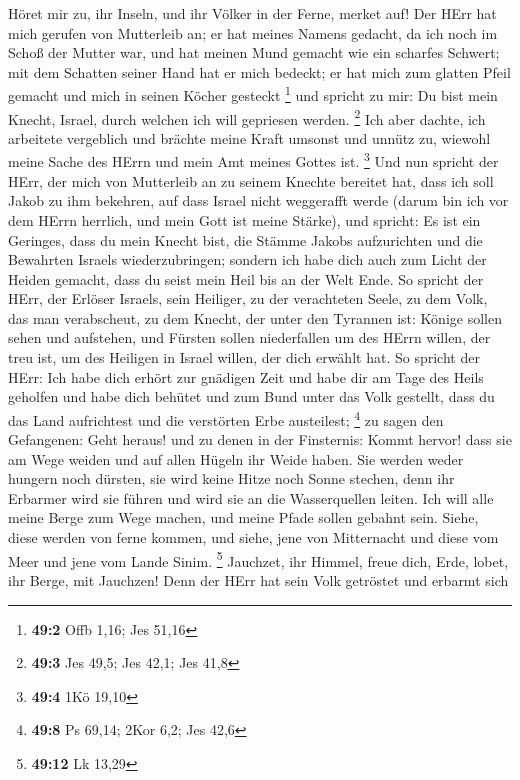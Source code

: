  Höret mir zu, ihr Inseln, und ihr Völker in der Ferne,
merket auf! Der HErr hat mich gerufen von Mutterleib an; er hat meines
Namens gedacht, da ich noch im Schoß der Mutter war,  und
hat meinen Mund gemacht wie ein scharfes Schwert; mit dem Schatten
seiner Hand hat er mich bedeckt; er hat mich zum glatten Pfeil gemacht
und mich in seinen Köcher gesteckt \footnote{\textbf{49:2} Offb 1,16;
  Jes 51,16}  und spricht zu mir: Du bist mein Knecht,
Israel, durch welchen ich will gepriesen werden. \footnote{\textbf{49:3}
  Jes 49,5; Jes 42,1; Jes 41,8}  Ich aber dachte, ich
arbeitete vergeblich und brächte meine Kraft umsonst und unnütz zu,
wiewohl meine Sache des HErrn und mein Amt meines Gottes ist.
\footnote{\textbf{49:4} 1Kö 19,10}  Und nun spricht der
HErr, der mich von Mutterleib an zu seinem Knechte bereitet hat, dass
ich soll Jakob zu ihm bekehren, auf dass Israel nicht weggerafft werde
(darum bin ich vor dem HErrn herrlich, und mein Gott ist meine Stärke),
 und spricht: Es ist ein Geringes, dass du mein Knecht bist,
die Stämme Jakobs aufzurichten und die Bewahrten Israels
wiederzubringen; sondern ich habe dich auch zum Licht der Heiden
gemacht, dass du seist mein Heil bis an der Welt Ende.  So
spricht der HErr, der Erlöser Israels, sein Heiliger, zu der verachteten
Seele, zu dem Volk, das man verabscheut, zu dem Knecht, der unter den
Tyrannen ist: Könige sollen sehen und aufstehen, und Fürsten sollen
niederfallen um des HErrn willen, der treu ist, um des Heiligen in
Israel willen, der dich erwählt hat.  So spricht der HErr:
Ich habe dich erhört zur gnädigen Zeit und habe dir am Tage des Heils
geholfen und habe dich behütet und zum Bund unter das Volk gestellt,
dass du das Land aufrichtest und die verstörten Erbe austeilest;
\footnote{\textbf{49:8} Ps 69,14; 2Kor 6,2; Jes 42,6}  zu
sagen den Gefangenen: Geht heraus! und zu denen in der Finsternis: Kommt
hervor! dass sie am Wege weiden und auf allen Hügeln ihr Weide haben.
 Sie werden weder hungern noch dürsten, sie wird keine
Hitze noch Sonne stechen, denn ihr Erbarmer wird sie führen und wird sie
an die Wasserquellen leiten.  Ich will alle meine Berge zum
Wege machen, und meine Pfade sollen gebahnt sein.  Siehe,
diese werden von ferne kommen, und siehe, jene von Mitternacht und diese
vom Meer und jene vom Lande Sinim. \footnote{\textbf{49:12} Lk 13,29}
 Jauchzet, ihr Himmel, freue dich, Erde, lobet, ihr Berge,
mit Jauchzen! Denn der HErr hat sein Volk getröstet und erbarmt sich
